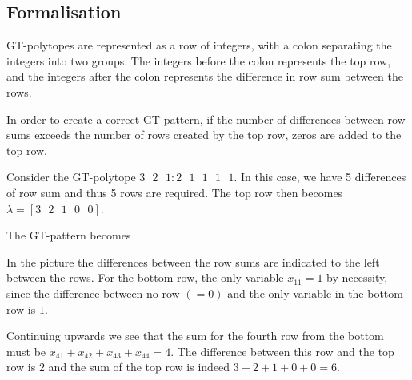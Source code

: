 
\subsection{Formalisation}
	GT-polytopes are represented as a row of integers, with a colon separating 
	the integers into two groups. 
	The integers before the colon represents the top row, and the integers after 
	the colon represents the difference in row sum between the rows. 
	
	In order to create a correct GT-pattern, if the number of differences between row sums 
	exceeds the number of rows created by the top row, zeros are added to the top row. 
	\begin{example} \label{example:patterns}
		Consider the GT-polytope 
		$3\text{ }2\text{ }1 : 2\text{ }1\text{ }1\text{ }1\text{ }1$. 
		In this case, we have 5 differences of row sum and thus 5 rows are required.  
		The top row then becomes $\lambda = [3\text{ }2\text{ }1\text{ }0\text{ }0]$. 
		
		The GT-pattern becomes 
		\begin{center}
		\end{center}
		In the picture the differences between the row sums are indicated to the left 
		between the rows. 
		For the bottom row, the only variable $x_{11} = 1$ by necessity, since 
		the difference between no row $(=0)$ and the only variable in the bottom row 
		is $1$. 
		
		Continuing upwards we see that the sum for the fourth row from the bottom must be 
		$x_{41} + x_{42} + x_{43} + x_{44} = 4$. The difference between this row and 
		the top row is $2$ and the sum of the top row is indeed $3 + 2 + 1 + 0 + 0 = 6$.
	\end{example}
	
